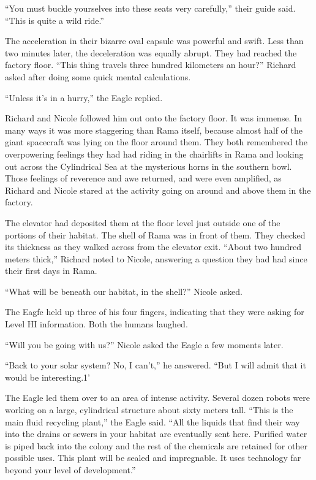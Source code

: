 \documentclass[]{article}
\begin{document}
{“You must buckle yourselves into these seats very carefully,” their guide said. “This is quite a wild ride.”

The acceleration in their bizarre oval capsule was powerful and swift. Less than two minutes later, the deceleration was equally abrupt. They had reached the factory floor. “This thing travels three hundred kilometers an hour?” Richard asked after doing some quick mental calculations.

“Unless it’s in a hurry,” the Eagle replied.

Richard and Nicole followed him out onto the factory floor. It was immense. In many ways it was more staggering than Rama itself, because almost half of the giant spacecraft was lying on the floor around them. They both remembered the overpowering feelings they had had riding in the chairlifts in Rama and looking out across the Cylindrical Sea at the mysterious horns in the southern bowl. Those feelings of reverence and awe returned, and were even amplified, as Richard and Nicole stared at the activity going on around and above them in the factory.

The elevator had deposited them at the floor level just outside one of the portions of their habitat. The shell of Rama was in front of them. They checked its thickness as they walked across from the elevator exit. “About two hundred meters thick,” Richard noted to Nicole, answering a question they had had since their first days in Rama.

“What will be beneath our habitat, in the shell?” Nicole asked.

The Eagfe held up three of his four fingers, indicating that they were asking for Level HI information. Both the humans laughed.

“Will you be going with us?” Nicole asked the Eagle a few moments later.

“Back to your solar system? No, I can’t,” he answered. “But I will admit that it would be interesting.1’

The Eagle led them over to an area of intense activity. Several dozen robots were working on a large, cylindrical structure about sixty meters tall. “This is the main fluid recycling plant,” the Eagle said. “All the liquids that find their way into the drains or sewers in your habitat are eventually sent here. Purified water is piped back into the colony and the rest of the chemicals are retained for other possible uses. This plant will be sealed and impregnable. It uses technology far beyond your level of development.”

}
\end{document}
